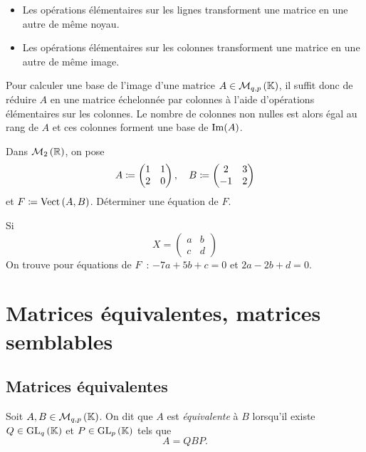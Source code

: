 \documentclass{magnolia}
\begin{document}
\begin{proposition}
\begin{itemize}
\item Les opérations élémentaires sur les lignes transforment une matrice en une autre de même noyau.
\item Les opérations élémentaires sur les colonnes transforment une matrice en une autre de même image.
\end{itemize}
\end{proposition}

\begin{remarqueUnique}
\remarque Pour calculer une base de l'image d'une matrice $A\in\mathcal{M}_{q,p}\left(\mathbb{K}\right)$, il suffit donc
  de réduire $A$ en une matrice échelonnée par colonnes à l'aide d'opérations élémentaires
  sur les colonnes.
  Le nombre de colonnes non nulles est alors égal au rang de $A$ et ces colonnes forment
  une base de $\operatorname{Im}(A)$.
\end{remarqueUnique}

\begin{exoUnique}
  \exo Dans $\mathcal{M}_{2}\left(\mathbb{R}\right)$, on pose
    \[A\coloneqq
    \begin{pmatrix}
    1 & 1\\
    2 & 0
    \end{pmatrix}, \quad B\coloneqq
    \begin{pmatrix}
    2 & 3\\
    -1 & 2
    \end{pmatrix}\]
    et $F\coloneqq\operatorname{Vect}\left(A,B\right)$. Déterminer une équation de $F$.
    \begin{sol}
    Si
    \[X=
    \begin{pmatrix}
    a & b\\
    c & d
    \end{pmatrix}\]
    On trouve pour équations de $F$~: $-7a+5b+c=0$ et $2a-2b+d=0$.
    \end{sol}
\end{exoUnique}

\section{Matrices équivalentes, matrices semblables}

\subsection{Matrices équivalentes}

\begin{definition}[utile=-3]
Soit $A,B\in\mathcal{M}_{q,p}\left(\mathbb{K}\right)$. On dit que $A$ est \emph{équivalente} à $B$ lorsqu'il
existe $Q\in{\rm GL}_{q}\left(\mathbb{K}\right)$ et $P\in{\rm GL}_{p}\left(\mathbb{K}\right)$ tels que
\[A=QBP.\]
\end{definition}
\end{document}

